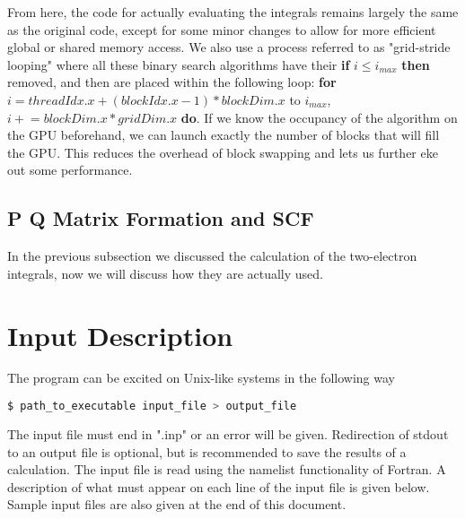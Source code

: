 \documentclass[12pt]{book}
\begin{document}
From here, the code for actually evaluating the integrals remains largely the same as the original code, except for some minor changes to allow for more efficient global or shared memory access. We also use a process referred to as "grid-stride looping" where all these binary search algorithms have their \textbf{if} $i \le i_{max}$ \textbf{then} removed, and then are placed within the following loop: \textbf{for} $i = threadIdx.x + (blockIdx.x - 1) * blockDim.x$ to $i_{max}$, $i \mathrel{+}= blockDim.x * gridDim.x$ \textbf{do}. If we know the occupancy of the algorithm on the GPU beforehand, we can launch exactly the number of blocks that will fill the GPU. This reduces the overhead of block swapping and lets us further eke out some performance.

\subsection{P Q Matrix Formation and SCF}

In the previous subsection we discussed the calculation of the two-electron integrals, now we will discuss how they are actually used. 


\section{Input Description}\label{inp_des}
The program can be excited on Unix-like systems in the following way
\begin{lstlisting}[language=bash]
	$ path_to_executable input_file > output_file
\end{lstlisting}

The input file must end in ".inp" or an error will be given. Redirection of stdout to an output file is optional, but is recommended to save the results of a calculation. The input file is read using the namelist functionality of Fortran. A description of what must appear on each line of the input file is given below. Sample input files are also given at the end of this document.
\end{document}

